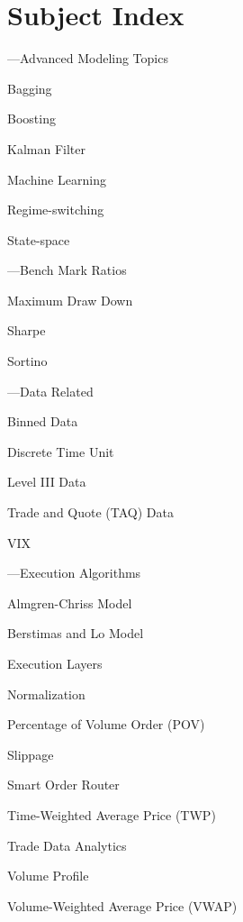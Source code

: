 \chapter*{Subject Index}
\nopagebreak
\begin{minipage}{0.40\textwidth}
\noindent ---Advanced Modeling Topics
	\begin{flushright}
	Bagging \par
	Boosting \par
	Kalman Filter \par
	Machine Learning \par
	Regime-switching \par
	State-space 
	\end{flushright}


\noindent ---Bench Mark Ratios
	\begin{flushright}
	Maximum Draw Down \par
	Sharpe \par
	Sortino
	\end{flushright}


\noindent ---Data Related
	\begin{flushright}
	Binned Data \par
	Discrete Time Unit \par
	Level III Data \par
	Trade and Quote (TAQ) Data \par 
	VIX
	\end{flushright}


\noindent ---Execution Algorithms
	\begin{flushright}
	Almgren-Chriss Model \par
	Berstimas and Lo Model \par
	Execution Layers \par
	Normalization \par
	Percentage of Volume Order (POV) \par
	Slippage \par
	Smart Order Router \par
	Time-Weighted Average Price (TWP) \par
	Trade Data Analytics \par
	Volume Profile \par
	Volume-Weighted Average Price (VWAP)
	\end{flushright}

\end{minipage} \hfill
%
